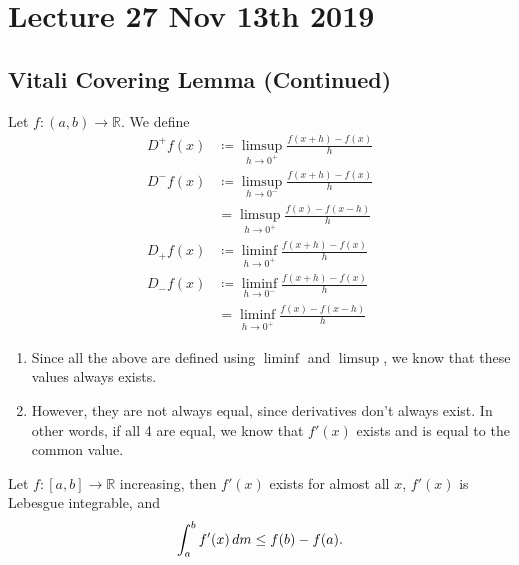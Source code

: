 \documentclass[notoc,notitlepage]{tufte-book}
\begin{document}


\chapter{Lecture 27 Nov 13th 2019}%
\label{chp:lecture_27_nov_13th_2019}

\section{Vitali Covering Lemma (Continued)}%
\label{sec:vitali_covering_lemma_continued}

\begin{defn}[$D^+, D^-, D_+, D_-$]\label{defn:d_upper_plus}\label{defn:d_upper_minus}\label{defn:d_lower_plus}\label{defn:d_lower_minus}
  Let $f : (a, b) \to \mathbb{R}$. We define
  \begin{align*}
    D^+ f(x) &\coloneqq \limsup_{h \to 0^+} \frac{f(x + h) - f(x)}{h} \\
    D^- f(x) &\coloneqq \limsup_{h \to 0^-} \frac{f(x + h) - f(x)}{h} \\
            &= \limsup_{h \to 0^+} \frac{f(x) - f(x - h)}{h} \\
    D_+ f(x) &\coloneqq \liminf_{h \to 0^+} \frac{f(x + h) - f(x)}{h} \\
    D_- f(x) &\coloneqq \liminf_{h \to 0^-} \frac{f(x + h) - f(x)}{h} \\
            &= \liminf_{h \to 0^+} \frac{f(x) - f(x - h)}{h}
  \end{align*}
\end{defn}

\begin{remark}
  \begin{enumerate}
    \item Since all the above are defined using $\liminf$ and $\limsup$,
      we know that these values always exists.
    \item However, they are not always equal, since derivatives
      don't always exist. In other words, if all 4 are equal,
      we know that $f'(x)$ exists and is equal to the common value.
  \end{enumerate}
\end{remark}

\begin{thm}\label{thm:partial_fundamental_theorem_of_calculus_for_increasing_functions}
  Let $f : [a, b] \to \mathbb{R}$ increasing, then $f'(x)$ exists
  for almost all $x$, $f'(x)$ is Lebesgue integrable, and
  \begin{equation*}
    \int_{a}^{b} f'(x) \mathop{}\!d{m} \leq f(b) - f(a).
  \end{equation*}
\end{thm}
\end{document}
